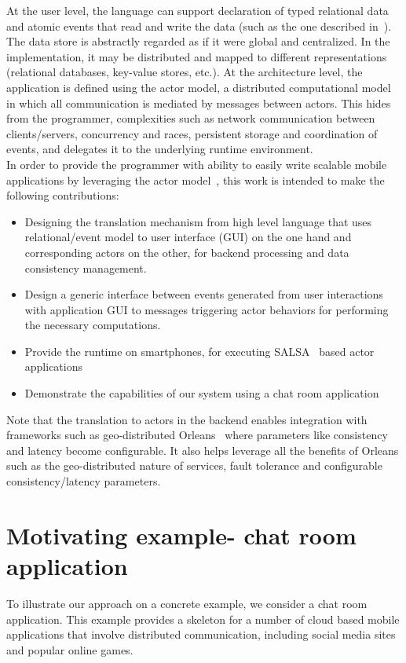 \documentclass[a4paper]{article}
\begin{document}
At the user level, the language can support declaration of typed relational data and atomic events that read and write the data (such as the one described in~\cite{Milicevic}). The data store is abstractly regarded as if it were global and centralized. In the implementation, it may be distributed and mapped to different representations (relational databases, key-value stores, etc.). At the architecture level, the application is defined using the actor model, a distributed computational model in which all communication is mediated by messages between actors. This hides from the programmer, complexities such as network communication between clients/servers, concurrency and races, persistent storage and coordination of events, and delegates it to the underlying runtime environment. \\

In order to provide the programmer with ability to easily write scalable mobile applications by leveraging the actor model~\cite{actors}, this work is intended to make the following contributions: 
\begin{itemize}
\item Designing the translation mechanism from high level language that uses relational/event model to user interface (GUI) on the one hand and corresponding actors on the other, for backend processing and data consistency management.  
\item Design a generic interface between events generated from user interactions with application GUI to messages triggering actor behaviors for performing the necessary computations.
\item Provide the runtime on smartphones, for executing SALSA~\cite{Varela:2001:PDR:583960.583964} based actor applications
\item Demonstrate the capabilities of our system using a chat room application
\end{itemize}

Note that the translation to actors in the backend enables integration with frameworks such as geo-distributed Orleans~\cite{orleans} where parameters like consistency and latency become configurable. It also helps leverage all the benefits of Orleans such as the geo-distributed nature of services, fault tolerance and configurable consistency/latency parameters. 

\section{Motivating example- chat room application}
To illustrate our approach on a concrete example, we
consider a chat room application. This example provides a skeleton for a number of cloud based mobile applications that involve distributed communication, including social media sites and popular online games. \\
\end{document}
